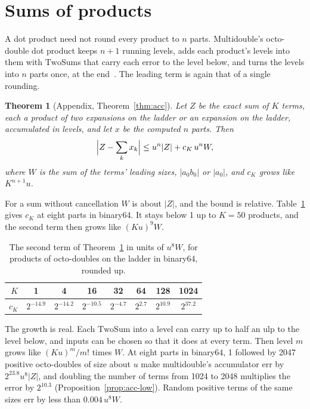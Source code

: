 \documentclass[conference]{IEEEtran}
\newtheorem{theorem}{Theorem}
\theoremstyle{definition}
\theoremstyle{remark}
\newcommand{\TwoSum}{\mathrm{TwoSum}}
\begin{document}
\section{Sums of products}\label{sec:dot}

A dot product need not round every product to $n$ parts. Multidouble's octo-double dot product keeps $n + 1$ running
levels, adds each product's levels into them with $\TwoSum$s that carry each error to the level below, and turns the
levels into $n$ parts once, at the end~\cite{md}. The leading term is again that of a single rounding.

\begin{theorem}[Appendix, Theorem~\ref{thm:acc}]\label{thm:dot}
Let $Z$ be the exact sum of $K$ terms, each a product of two expansions on the ladder or an expansion on the ladder,
accumulated in levels, and let $x$ be the computed $n$ parts. Then
\[
\Bigl|Z - \sum_k x_k\Bigr| \le u^n|Z| + c_K\,u^nW,
\]
where $W$ is the sum of the terms' leading sizes, $|a_0b_0|$ or $|a_0|$, and $c_K$ grows like $K^{n+1}u$.
\end{theorem}

For a sum without cancellation $W$ is about $|Z|$, and the bound is relative. Table~\ref{tab:dot} gives $c_K$ at
eight parts in binary64. It stays below 1 up to $K = 50$ products, and the second term then grows like $(Ku)^9W$.

\nopagebreak
\begin{table}[H]
\centering
\caption{The second term of Theorem~\ref{thm:dot} in units of $u^8W$, for products of octo-doubles on the ladder in
binary64, rounded up.}
\label{tab:dot}
\begin{tabular}{rccccccc}
\toprule
$K$ & 1 & 4 & 16 & 32 & 64 & 128 & 1024 \\
\midrule
$c_K$ & $2^{-14.9}$ & $2^{-14.2}$ & $2^{-10.5}$ & $2^{-4.7}$ & $2^{2.7}$ & $2^{10.9}$ & $2^{37.2}$ \\
\bottomrule
\end{tabular}
\end{table}

The growth is real. Each $\TwoSum$ into a level can carry up to half an ulp to the level below, and inputs can be
chosen so that it does at every term. Then level $m$ grows like $(Ku)^m/m!$ times $W$. At eight parts in binary64,
1 followed by 2047 positive octo-doubles of size about $u$ make multidouble's accumulator err by $2^{23.8}u^8|Z|$, and
doubling the number of terms from 1024 to 2048 multiplies the error by $2^{10.3}$ (Proposition~\ref{prop:acc-low}).
Random positive terms of the same sizes err by less than $0.004\,u^8W$.
\end{document}
